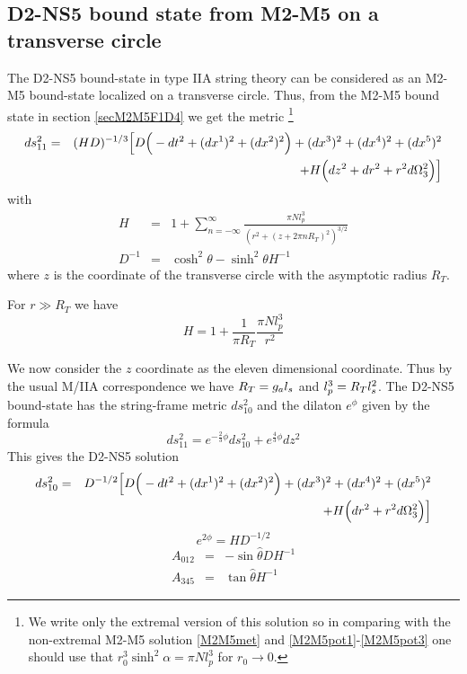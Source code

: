 \documentclass[a4paper,twoside,titlepage,12pt]{article}
\begin{document}
\subsection{D2-NS5 bound state from M2-M5 on a transverse circle}

The D2-NS5 bound-state in type IIA string theory can be considered as 
an M2-M5 bound-state localized on a transverse circle.
Thus, from the M2-M5 bound state in section \ref{secM2M5F1D4}
we get the metric%
\footnote{We write only the extremal version of this solution so in comparing 
with the non-extremal M2-M5 solution \eqref{M2M5met} and 
\eqref{M2M5pot1}-\eqref{M2M5pot3}
one should use that \( r_0^3 \sinh^2 \alpha = \pi N l_p^3 \)
for \( r_0 \rightarrow 0 \).}
%
\begin{eqnarray}
\label{M2M5zmet}
ds_{11}^2 &=& (HD)^{-1/3} \Big[ D \Big( - dt^2 +(dx^1)^2 + (dx^2)^2 \Big)
+ (dx^3)^2 +(dx^4)^2 + (dx^5)^2 
\nonumber \\ &&
+ H \Big( dz^2 + dr^2 + r^2 d\Omega_3^2 \Big) \Big]
\end{eqnarray}
%
with
%
\begin{eqnarray}
\label{M2M5zdef}
H &=& 1 + \sum_{n=-\infty}^{\infty} 
\frac{\pi N l_p^3}{(r^2 + (z+2\pi n R_T)^2 )^{3/2}}
\\
D^{-1} &=& \cosh^2 \theta - \sinh^2 \theta H^{-1}
\end{eqnarray}
%
where $z$ is the coordinate of the transverse circle with 
the asymptotic radius $R_T$.

For \( r \gg R_T \) we have
%
\begin{equation}
H = 1 + \frac{1}{\pi R_T } \frac{\pi N l_p^3}{r^2}
\end{equation}
%


We now consider the \( z \) coordinate as the eleven dimensional
coordinate. Thus by the usual M/IIA correspondence we
have \( R_T = g_a l_s \) and \( l_p^3 = R_T l_s^2 \).
The D2-NS5 bound-state has the string-frame
metric $ds_{10}^2$ and the dilaton $e^\phi$ given by the formula
%
\begin{equation}
ds_{11}^2 = e^{-\frac{2}{3} \phi} ds_{10}^2 + e^{\frac{4}{3}\phi} dz^2
\end{equation}
%
This gives the D2-NS5 solution
%
\begin{eqnarray}
ds_{10}^2 &=& D^{-1/2} \Big[ D \Big( - dt^2 +(dx^1)^2 + (dx^2)^2 \Big)
+ (dx^3)^2 +(dx^4)^2 + (dx^5)^2 
\nonumber \\ &&
+ H \Big( dr^2 + r^2 d\Omega_3^2 \Big) \Big]
\end{eqnarray}
%
\begin{equation}
e^{2\phi} = H D^{-1/2}
\end{equation}
%
\begin{eqnarray}
A_{012} &=& - \sin \hat{\theta} D H^{-1} 
\\
A_{345} &=& \tan \hat{\theta} H^{-1}
\end{eqnarray}
\end{document}
